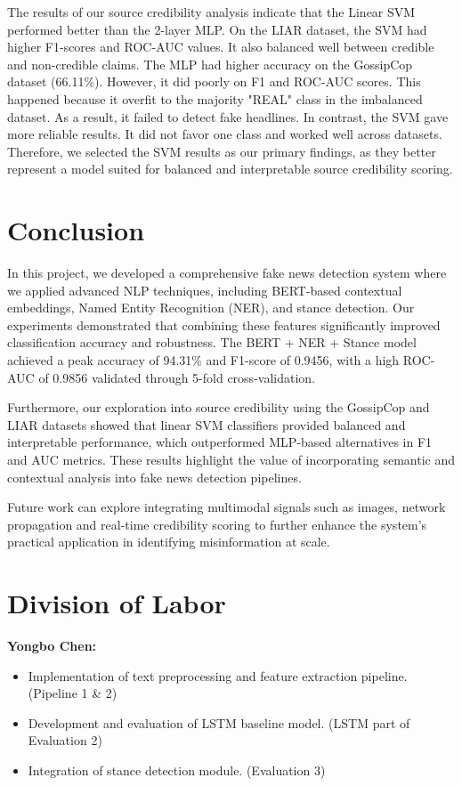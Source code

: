 \documentclass[11pt,a4paper]{article}
\begin{document}
The results of our source credibility analysis indicate that the Linear SVM performed better than the 2-layer MLP. On the LIAR dataset, the SVM had higher F1-scores and ROC-AUC values. It also balanced well between credible and non-credible claims. The MLP had higher accuracy on the GossipCop dataset (66.11\%). However, it did poorly on F1 and ROC-AUC scores. This happened because it overfit to the majority "REAL" class in the imbalanced dataset. As a result, it failed to detect fake headlines. In contrast, the SVM gave more reliable results. It did not favor one class and worked well across datasets. Therefore, we selected the SVM results as our primary findings, as they better represent a model suited for balanced and interpretable source credibility scoring.

\section{Conclusion}

In this project, we developed a comprehensive fake news detection system where we applied advanced NLP techniques, including BERT-based contextual embeddings, Named Entity Recognition (NER), and stance detection. Our experiments demonstrated that combining these features significantly improved classification accuracy and robustness. The BERT + NER + Stance model achieved a peak accuracy of 94.31\% and F1-score of 0.9456, with a high ROC-AUC of 0.9856 validated through 5-fold cross-validation. 

Furthermore, our exploration into source credibility using the GossipCop \cite{gossipcop_dataset} and LIAR \cite{liar_dataset} datasets showed that linear SVM classifiers provided balanced and interpretable performance, which outperformed MLP-based alternatives in F1 and AUC metrics. These results highlight the value of incorporating semantic and contextual analysis into fake news detection pipelines. 

Future work can explore integrating multimodal signals such as images, network propagation and real-time credibility scoring to further enhance the system's practical application in identifying misinformation at scale.

\section{Division of Labor}

\noindent\textbf{Yongbo Chen:}
\begin{itemize}[noitemsep,topsep=0pt]
    \item Implementation of text preprocessing and feature extraction pipeline. (Pipeline 1 \& 2)
    \item Development and evaluation of LSTM baseline model. (LSTM part of Evaluation 2)
    \item Integration of stance detection module. (Evaluation 3)
\end{itemize}
\end{document}
